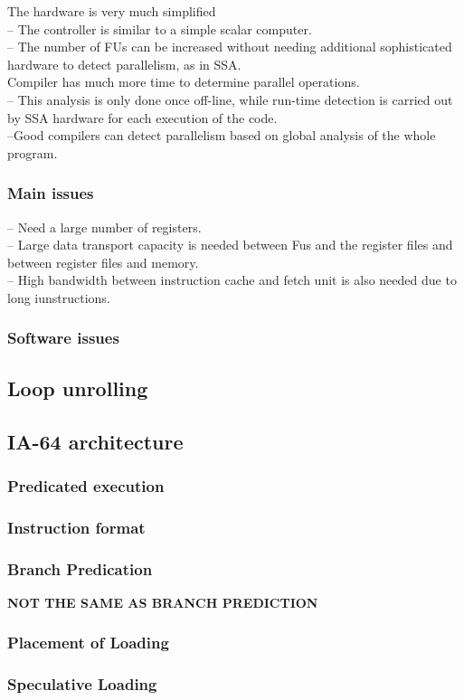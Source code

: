The hardware is very much simplified \\
-- The controller is similar to a simple scalar computer. \\
-- The number of FUs can be increased without needing additional sophisticated hardware to detect parallelism, as in SSA. \\

Compiler has much more time to determine parallel operations. \\
-- This analysis is only done once off-line, while run-time detection is carried out by SSA hardware for each execution of the code. \\
--Good compilers can detect parallelism based on global analysis of the whole program. \\

\subsubsection{Main issues}
-- Need a large number of registers. \\
-- Large data transport capacity is needed between Fus and the register files and between register files and memory. \\
-- High bandwidth between instruction cache and fetch unit is also needed due to long iunstructions.

\subsubsection{Software issues}

\subsection{Loop unrolling}

\subsection{IA-64 architecture}
\subsubsection{Predicated execution}
\subsubsection{Instruction format}
\subsubsection{Branch Predication}
\textbf{NOT THE SAME AS BRANCH PREDICTION}
\subsubsection{Placement of Loading}
\subsubsection{Speculative Loading}

